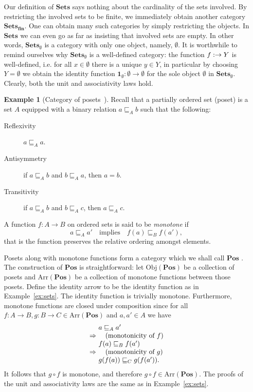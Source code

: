 \documentclass[10pt,twoside,a4paper]{article}
\makeatletter
\newcounter{theorem}
\theoremstyle{plain}
\theoremstyle{definition}
\newtheorem{example}{Example}[section]
\newcommand{\ba}{\begin{array}}
\newcommand{\ea}{\end{array}}
\newenvironment{derivation}{\small\[\ba{@{}r@{~}l@{}}}{\ea\]\normalsize\ignorespacesafterend}
\newcommand{\reason}[1]{\quad (\text{#1})}
\newcommand{\Id}[1]{%
  \ensuremath{\mathbf{1}_{#1}}%
}
\newcommand{\Obj}[1]{%
  \ensuremath{\mathrm{Obj}(#1)}%
}
\newcommand{\Arr}[1]{%
  \ensuremath{\mathrm{Arr}(#1)}%
}
\newcommand{\Catname}[1]{%
  \ensuremath{\mathbf{#1}}%
}
\newcommand{\Sets}[0]{\Catname{Sets}}
\newcommand{\Pos}[0]{\Catname{Pos}}
\makeatother
\begin{document}
Our definition of \Sets{} says nothing about the cardinality of the
sets involved. By restricting the involved sets to be finite, we
immediately obtain another category $\Sets_{\mathbf{fin}}$. One can
obtain many such categories by simply restricting the objects. In
\Sets{} we can even go as far as insisting that involved sets are
empty. In other words, $\Sets{}_\emptyset$ is a category with only one
object, namely, $\emptyset$. It is worthwhile to remind ourselves why
$\Sets{}_\emptyset$ is a well-defined category: the function
$f : \empty \to Y$ is well-defined, i.e. for all $x \in \emptyset$
there is a unique $y \in Y$, in particular by choosing $Y = \emptyset$
we obtain the identity function
$\Id{\emptyset} : \emptyset \to \emptyset$ for the sole object
$\emptyset$ in $\Sets{}_{\emptyset}$. Clearly, both the unit and
associativity laws hold.

\begin{example}[Category of posets~\cite{Awodey11}]
  Recall that a partially ordered set (poset) is a set $A$ equipped
  with a binary relation $a \sqsubseteq_A b$ such that the following:
  \begin{description}
    \item[Reflexivity] $a \sqsubseteq_A a$.
    \item[Antisymmetry] if $a \sqsubseteq_A b$ and $b \sqsubseteq_A a$, then $a = b$.
    \item[Transitivity] if $a \sqsubseteq_A b$ and $b \sqsubseteq_A c$, then $a \sqsubseteq_A c$.
  \end{description}
  A function $f : A \to B$ on ordered sets is said to be \emph{monotone} if
\[
  a \sqsubseteq_A a' \quad \text{implies} \quad f(a) \sqsubseteq_B f(a'),
\]
that is the function preserves the relative ordering amongst elements.

Posets along with monotone functions form a category which we shall
call \Pos{}. The construction of \Pos{} is straightforward: let
\Obj{\Pos} be a collection of posets and \Arr{\Pos} be a collection of
monotone functions between those posets. Define the identity arrow to
be the identity function as in Example~\ref{ex:sets}. The identity
function is trivially monotone. Furthermore, monotone functions are
closed under composition since for all
$f : A \to B,g : B \to C \in \Arr{\Pos}$ and $a,a' \in A$ we have
\begin{derivation}
 & a \sqsubseteq_A a' \\
 \Rightarrow & \reason{monotonicity of $f$} \\
 &  f(a) \sqsubseteq_B f(a') \\
 \Rightarrow & \reason{monotonicity of $g$} \\
 &   g(f(a)) \sqsubseteq_C g(f(a')).
\end{derivation}
It follows that $g \circ f$ is monotone, and therefore
$g \circ f \in \Arr{\Pos}$. The proofs of the unit and associativity
laws are the same as in Example~\ref{ex:sets}.
\end{example}
\end{document}
